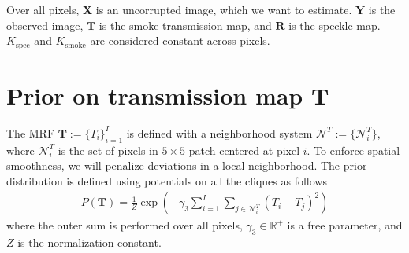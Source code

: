 Over all pixels, $\mathbf{X}$ is an uncorrupted image, which we want to estimate. $\mathbf{Y}$ is the observed image, $\mathbf{T}$ is the smoke transmission map, and $\mathbf{R}$ is the speckle map. $K_\text{spec}$ and $K_\text{smoke}$ are considered constant across pixels.


\section{Prior on transmission map $\mathbf{T}$}
\label{sec:modelT}
The MRF $\mathbf{T} := \lbrace T_i \rbrace_{i=1}^{I}$ is defined with a neighborhood system $\mathcal{N}^T := \lbrace \mathcal{N}_i^T \rbrace$, where $\mathcal{N}_i^T$ is the set of pixels in $5 \times 5$ patch centered at pixel $i$. To enforce spatial smoothness, we will penalize deviations in a local neighborhood. The prior distribution is defined using potentials on all the cliques as follows
\begin{align}
    P(\mathbf{T}) = \frac{1}{Z} \exp \left( - \gamma_3 \sum_{i=1}^{I} \sum_{j \in \mathcal{N}_i^T} (T_i - T_j)^2 \right) \label{eqn:spatialsmoothness}
\end{align}
where the outer sum is performed over all pixels, $\gamma_3 \in \mathbb{R}^+$ is a free parameter, and $Z$ is the normalization constant.
